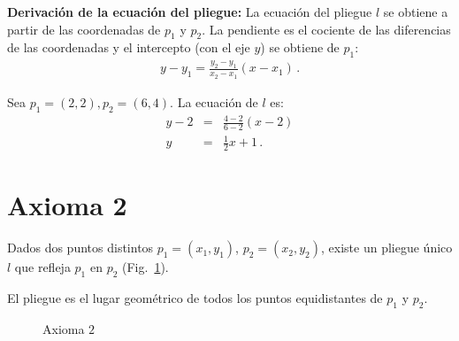 \noindent\textbf{Derivación de la ecuación del pliegue:}
La ecuación del pliegue $l$ se obtiene a partir de las coordenadas de $p_1$ y $p_2$. La pendiente es el cociente de las diferencias de las coordenadas y el intercepto (con el eje $y$) se obtiene de $p_1$:
\begin{align}
y - y_1 = \frac{y_2-y_1}{x_2-x_1}(x-x_1)\,.
\end{align}

\begin{example}
Sea $p_1=(2,2), p_2=(6,4)$. La ecuación de $l$ es:
\begin{eqnarray*}
y-2&=&\frac{4-2}{6-2}(x-2)\\
y&=&\frac{1}{2}x+1\,.
\end{eqnarray*}
\end{example}



\section{Axioma 2}\label{s.ax2}

\begin{axiom}
Dados dos puntos distintos $p_1=(x_1,y_1)$, $p_2=(x_2,y_2)$, existe un pliegue único $l$ que refleja $p_1$ en $p_2$ (Fig.~\ref{f.origami-axiom2}).
\end{axiom}

El pliegue es el lugar geométrico de todos los puntos equidistantes de $p_1$ y $p_2$.

\begin{figure}[t]
\begin{center}
\end{center}
\caption{Axioma $2$}\label{f.origami-axiom2}
\end{figure}

